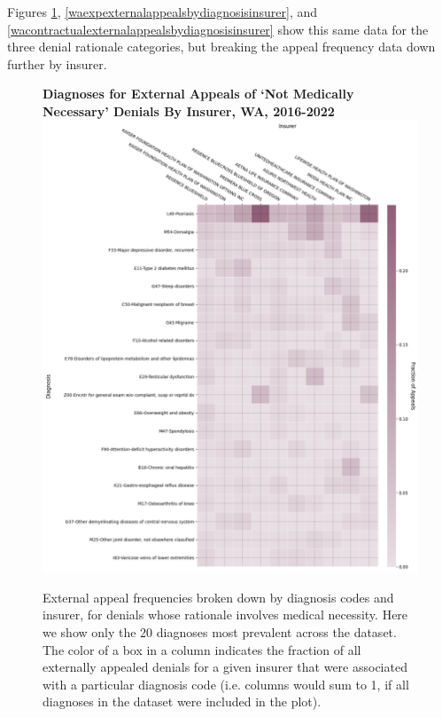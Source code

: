 \documentclass[12pt, a4paper,twoside]{report}
\theoremstyle{plain} %
\theoremstyle{definition} %
\theoremstyle{remark} %
\numberwithin{equation}{chapter}
\begin{document}
		Figures \ref{wanmnexternalappealsbydiagnosisinsurer}, \ref{waexpexternalappealsbydiagnosisinsurer}, and \ref{wacontractualexternalappealsbydiagnosisinsurer} show this same data for the three denial rationale categories, but breaking the appeal frequency data down further by insurer.
		
		\begin{figure}[h!]
			\centering
			\textbf{Diagnoses for External Appeals of `Not Medically Necessary' Denials By Insurer, WA, 2016-2022}
			\includegraphics[width=.8\textwidth]{images/wa_external_appeals/nmn_diagnosis_by_insurer.png}
			\caption{External appeal frequencies broken down by diagnosis codes and insurer, for denials whose rationale involves medical necessity. Here we show only the 20 diagnoses most prevalent across the dataset. The color of a box in a column indicates the fraction of all externally appealed denials for a given insurer that were associated with a particular diagnosis code (i.e. columns would sum to 1, if all diagnoses in the dataset were included in the plot).}
			\label{wanmnexternalappealsbydiagnosisinsurer}
		\end{figure}
		
\end{document}
